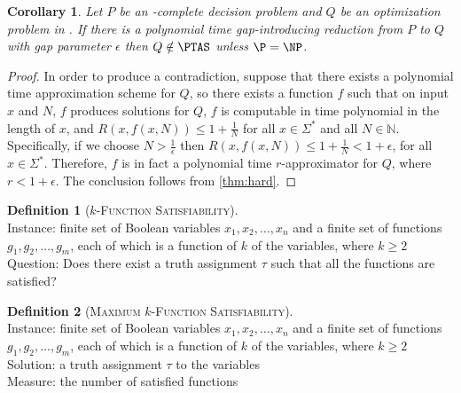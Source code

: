 \documentclass[]{article}
\theoremstyle{plain}
\newtheorem{corollary}{Corollary}
\theoremstyle{definition}
\newtheorem{definition}{Definition}
\newenvironment{instance}{\\Instance:}{}
\newenvironment{measure}{\\Measure:}{}
\newenvironment{solution}{\\Solution:}{}
\newenvironment{question}{\\Question:}{}
\begin{document}
\begin{corollary}\label{cor:notinptas}
  Let $P$ be an \NP-complete decision problem and $Q$ be an optimization problem in \NPO.
  If there is a polynomial time gap-introducing reduction from $P$ to $Q$ with gap parameter $\epsilon$ then $Q \notin \PTAS$ unless $\P = \NP$.
\end{corollary}
\begin{proof}
  In order to produce a contradiction, suppose that there exists a polynomial time approximation scheme for $Q$, so there exists a function $f$ such that on input $x$ and $N$, $f$ produces solutions for $Q$, $f$ is computable in time polynomial in the length of $x$, and $R(x, f(x, N)) \leq 1 + \frac{1}{N}$ for all $x \in \Sigma^*$ and all $N \in \mathbb{N}$.
  Specifically, if we choose $N > \frac{1}{\epsilon}$ then $R(x, f(x, N)) \leq 1 + \frac{1}{N} < 1 + \epsilon$, for all $x \in \Sigma^*$.
  Therefore, $f$ is in fact a polynomial time $r$-approximator for $Q$, where $r < 1 + \epsilon$.
  The conclusion follows from \autoref{thm:hard}.
\end{proof}

\begin{definition}[\textsc{$k$-Function Satisfiability}]
  \mbox{}
  \begin{instance}
    finite set of Boolean variables $x_1, x_2, \ldots, x_n$ and a finite set of  functions $g_1, g_2, \ldots, g_m$, each of which is a function of $k$ of the variables, where $k \geq 2$
  \end{instance}
  \begin{question}
    Does there exist a truth assignment $\tau$ such that all the functions are satisfied?
  \end{question}
\end{definition}

\begin{definition}[\textsc{Maximum $k$-Function Satisfiability}]
  \mbox{}
  \begin{instance}
    finite set of Boolean variables $x_1, x_2, \ldots, x_n$ and a finite set of  functions $g_1, g_2, \ldots, g_m$, each of which is a function of $k$ of the variables, where $k \geq 2$
  \end{instance}
  \begin{solution}
    a truth assignment $\tau$ to the variables
  \end{solution}
  \begin{measure}
   the number of satisfied functions
  \end{measure}
\end{definition}
\end{document}

